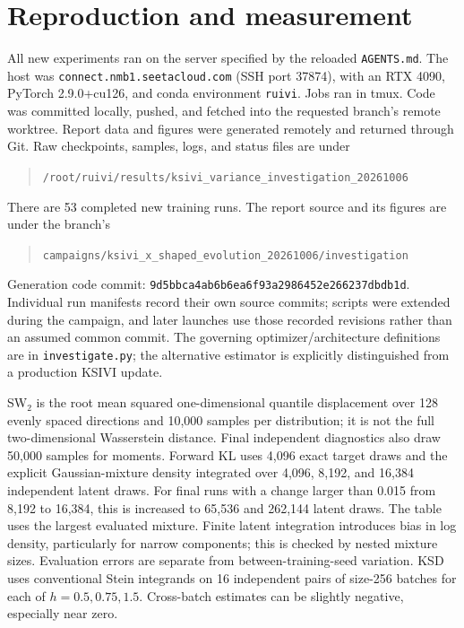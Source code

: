 \documentclass[11pt,a4paper]{article}
\numberwithin{equation}{section}
\begin{document}
\section{Reproduction and measurement}
All new experiments ran on the server specified by the reloaded
\texttt{AGENTS.md}. The host was \nolinkurl{connect.nmb1.seetacloud.com}
(SSH port 37874), with an RTX 4090, PyTorch 2.9.0+cu126, and conda
environment \texttt{ruivi}. Jobs ran in
tmux. Code was committed locally, pushed, and fetched into the requested
branch's remote worktree. Report data and figures were generated remotely
and returned through Git. Raw checkpoints, samples, logs, and status files
are under
\begin{quote}\small\nolinkurl{/root/ruivi/results/ksivi_variance_investigation_20261006}\end{quote}
There are 53 completed new training runs. The report source and its
figures are under the branch's
\begin{quote}\small\nolinkurl{campaigns/ksivi_x_shaped_evolution_20261006/investigation}\end{quote}
Generation code commit: {\small\texttt{9d5bbca4ab6b6ea6f93a2986452e266237dbdb1d}}.
Individual run manifests record
their own source commits; scripts were extended during the campaign, and
later launches use those recorded revisions rather than an assumed common
commit. The governing optimizer/architecture definitions are in
\texttt{investigate.py}; the alternative estimator is explicitly distinguished
from a production KSIVI update.

SW$_2$ is the root mean squared one-dimensional quantile displacement over
128 evenly spaced directions and 10,000 samples per distribution; it is
not the full two-dimensional Wasserstein distance. Final independent
diagnostics also draw 50,000 samples for moments. Forward KL uses 4,096 exact
target draws and the explicit Gaussian-mixture density integrated over
4,096, 8,192, and 16,384 independent latent draws. For final runs with a
change larger than 0.015 from 8,192 to 16,384, this is increased to 65,536
and 262,144 latent draws. The table uses the largest evaluated mixture.
Finite latent integration
introduces bias in log density, particularly for narrow components; this is
checked by nested mixture sizes. Evaluation errors are separate from
between-training-seed variation. KSD uses conventional Stein integrands on
16 independent pairs of size-256 batches for each of $h=0.5,0.75,1.5$.
Cross-batch estimates can be slightly negative, especially near zero.
\end{document}
